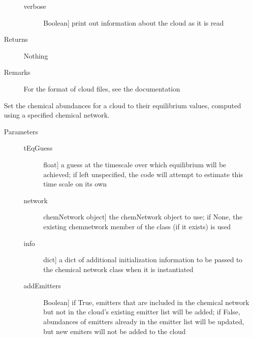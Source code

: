\documentclass[letterpaper,10pt,english]{sphinxmanual}
\begin{document}
\begin{fulllineitems}
\begin{fulllineitems}
\begin{description}
\begin{description}
\item[{verbose}] \leavevmode{[}Boolean{]}
print out information about the cloud as it is read

\end{description}

\item[{Returns}] \leavevmode
Nothing

\item[{Remarks}] \leavevmode
For the format of cloud files, see the documentation

\end{description}

\end{fulllineitems}


\begin{fulllineitems}
\label{fulldoc:despotic.cloud.setChemEq}
Set the chemical abundances for a cloud to their equilibrium
values, computed using a specified chemical network.
\begin{description}
\item[{Parameters}] \leavevmode\begin{description}
\item[{tEqGuess}] \leavevmode{[}float{]}
a guess at the timescale over which equilibrium will be
achieved; if left unspecified, the code will attempt to
estimate this time scale on its own

\item[{network}] \leavevmode{[}chemNetwork object{]}
the chemNetwork object to use; if None, the existing
chemnetwork member of the class (if it exists) is used

\item[{info}] \leavevmode{[}dict{]}
a dict of additional initialization information to be passed
to the chemical network class when it is instantiated

\item[{addEmitters}] \leavevmode{[}Boolean{]}
if True, emitters that are included in the chemical
network but not in the cloud's existing emitter list will
be added; if False, abundances of emitters already in the
emitter list will be updated, but new emiters will not be
added to the cloud


\end{description}
\end{description}
\end{fulllineitems}
\end{fulllineitems}
\end{document}
